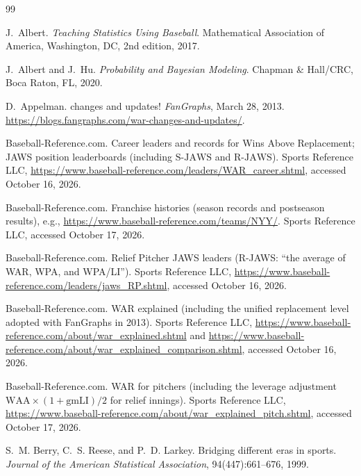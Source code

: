 \documentclass[11pt,letterpaper]{article}
\theoremstyle{plain}
\theoremstyle{definition}
\theoremstyle{remark}
\newcommand{\SJAWS}{\mathrm{S\text{-}JAWS}}
\newcommand{\RJAWS}{\mathrm{R\text{-}JAWS}}
\begin{document}
\begin{thebibliography}{99}

J.~Albert.
\newblock \emph{Teaching Statistics Using Baseball}.
\newblock Mathematical Association of America, Washington, DC, 2nd edition, 2017.

J.~Albert and J.~Hu.
\newblock \emph{Probability and Bayesian Modeling}.
\newblock Chapman \& Hall/CRC, Boca Raton, FL, 2020.

D.~Appelman.
 changes and updates!
\newblock \emph{FanGraphs}, March 28, 2013. \url{https://blogs.fangraphs.com/war-changes-and-updates/}.

{Baseball-Reference.com}.
\newblock Career leaders and records for Wins Above Replacement; JAWS position leaderboards (including $\SJAWS$ and $\RJAWS$).
\newblock Sports Reference LLC, \url{https://www.baseball-reference.com/leaders/WAR_career.shtml}, accessed October 16, 2026.

{Baseball-Reference.com}.
\newblock Franchise histories (season records and postseason results), e.g., \url{https://www.baseball-reference.com/teams/NYY/}.
\newblock Sports Reference LLC, accessed October 17, 2026.

{Baseball-Reference.com}.
\newblock Relief Pitcher JAWS leaders (R-JAWS: ``the average of WAR, WPA, and WPA/LI'').
\newblock Sports Reference LLC, \url{https://www.baseball-reference.com/leaders/jaws_RP.shtml}, accessed October 16, 2026.

{Baseball-Reference.com}.
\newblock WAR explained (including the unified replacement level adopted with FanGraphs in 2013).
\newblock Sports Reference LLC, \url{https://www.baseball-reference.com/about/war_explained.shtml} and \url{https://www.baseball-reference.com/about/war_explained_comparison.shtml}, accessed October 16, 2026.

{Baseball-Reference.com}.
\newblock WAR for pitchers (including the leverage adjustment $\mathrm{WAA}\times(1+\mathrm{gmLI})/2$ for relief innings).
\newblock Sports Reference LLC, \url{https://www.baseball-reference.com/about/war_explained_pitch.shtml}, accessed October 17, 2026.

S.~M. Berry, C.~S. Reese, and P.~D. Larkey.
\newblock Bridging different eras in sports.
\newblock \emph{Journal of the American Statistical Association}, 94(447):661--676, 1999.


\end{thebibliography}
\end{document}

